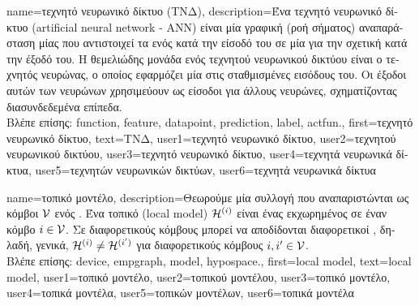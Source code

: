{name={\foreignlanguage{greek}{τεχνητό νευρωνικό δίκτυο (ΤΝΔ)}},
	description={\foreignlanguage{greek}{Ένα τεχνητό νευρωνικό δίκτυο}\linebreak 
		(artificial neural network - ANN) \foreignlanguage{greek}{είναι μία γραφική (ροή σήματος) αναπαράσταση
		μίας}  \foreignlanguage{greek}{που αντιστοιχεί τα}  \foreignlanguage{greek}{ενός}
		 \foreignlanguage{greek}{κατά την είσοδό του σε μία}  
		\foreignlanguage{greek}{για την σχετική}  \foreignlanguage{greek}{κατά την έξοδό του. Η θεμελιώδης 
		μονάδα ενός τεχνητού νευρωνικού δικτύου είναι ο τεχνητός νευρώνας, ο οποίος εφαρμόζει μία}  
		 \foreignlanguage{greek}{στις σταθμισμένες εισόδους του.  
		Οι έξοδοι αυτών των νευρώνων χρησιμεύουν ως είσοδοι για άλλους νευρώνες, 
		σχηματίζοντας διασυνδεδεμένα επίπεδα.}\\
		\foreignlanguage{greek}{Βλέπε επίσης:} \gls{function}, \gls{feature}, \gls{datapoint}, \gls{prediction}, \gls{label}, \gls{actfun}.},
	first={\foreignlanguage{greek}{τεχνητό νευρωνικό δίκτυο}},
	text={\foreignlanguage{greek}{ΤΝΔ}},
	user1={\foreignlanguage{greek}{τεχνητό νευρωνικό δίκτυο}}, %
	user2={\foreignlanguage{greek}{τεχνητού νευρωνικού δικτύου}}, %
	user3={\foreignlanguage{greek}{τεχνητό νευρωνικό δίκτυο}}, %
	user4={\foreignlanguage{greek}{τεχνητά νευρωνικά δίκτυα}}, %
	user5={\foreignlanguage{greek}{τεχνητών νευρωνικών δικτύων}}, %
	user6={\foreignlanguage{greek}{τεχνητά νευρωνικά δίκτυα}} %
}

{name={\foreignlanguage{greek}{τοπικό μοντέλο}},
	description={\foreignlanguage{greek}{Θεωρούμε μία συλλογή}  
		\foreignlanguage{greek}{που αναπαριστώνται ως κόμβοι $\mathcal{V}$ ενός} . \foreignlanguage{greek}{Ένα τοπικό} 
		 (local model) $\mathcal{H}^{(i)}$ 
		\foreignlanguage{greek}{είναι ένας}  \foreignlanguage{greek}{εκχωρημένος σε έναν κόμβο $i \in \mathcal{V}$. 
		Σε διαφορετικούς κόμβους μπορεί να αποδίδονται διαφορετικοί} , \foreignlanguage{greek}{δηλαδή, γενικά, 
		$\mathcal{H}^{(i)} \neq \mathcal{H}^{(i')}$ για διαφορετικούς κόμβους} $i, i' \in \mathcal{V}$.\\
		\foreignlanguage{greek}{Βλέπε επίσης:} \gls{device}, \gls{empgraph}, \gls{model}, \gls{hypospace}.},
		first={local model},
		text={local model},
		user1={\foreignlanguage{greek}{τοπικό μοντέλο}}, %
		user2={\foreignlanguage{greek}{τοπικού μοντέλου}}, %
		user3={\foreignlanguage{greek}{τοπικό μοντέλο}}, %
		user4={\foreignlanguage{greek}{τοπικά μοντέλα}}, %
		user5={\foreignlanguage{greek}{τοπικών μοντέλων}}, %
		user6={\foreignlanguage{greek}{τοπικά μοντέλα}} %
}

